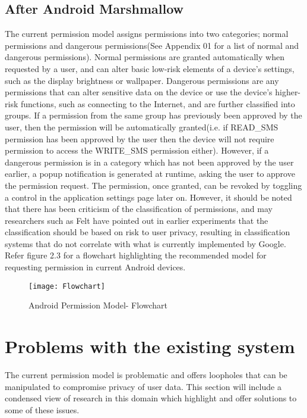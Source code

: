 \subsection{After Android Marshmallow}
The current permission model assigns permissions into two categories; normal permissions and dangerous permissions(See Appendix 01 for a list of normal and dangerous permissions). Normal permissions are granted automatically when requested by a user, and can alter basic low-risk elements of a device's settings, such as the display brightness or wallpaper. Dangerous permissions are any permissions that can alter sensitive data on the device or use the device's higher-risk functions, such as connecting to the Internet, and are further classified into groups. If a permission from the same group has previously been approved by the user, then the permission will be automatically granted(i.e. if READ\_SMS permission has been approved by the user then the device will not require permission to access the WRITE\_SMS permission either). However, if a dangerous permission is in a category which has not been approved by the user earlier, a popup notification is generated at runtime, asking the user to approve the permission request. The permission, once granted, can be revoked by toggling a control in the application settings page later on. However, it should be noted that there has been criticism of the classification of permissions, and may researchers such as Felt have pointed out in earlier experiments that the classification should be based on risk to user privacy\cite{felt2011android}, resulting in classification systems that do not correlate with what is currently implemented by Google\cite{androidyearinreview}. Refer figure 2.3 for a flowchart highlighting the recommended model for requesting permission in current Android devices.
\smallskip
\begin{figure}
\texttt{[image: Flowchart]}
\caption{Android Permission Model- Flowchart\cite{flowchartimage}}
\end{figure}
\smallskip 

\section{Problems with the existing system}
The current permission model is problematic and offers loopholes that can be manipulated to compromise privacy of user data. This section will include a condensed view of research in this domain which highlight and offer solutions to some of these issues. 

